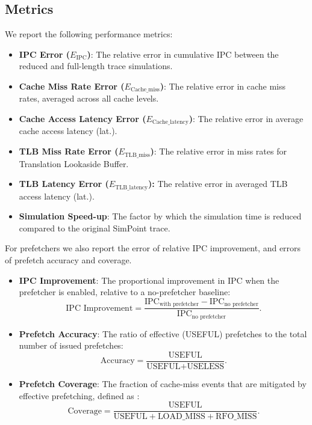 \documentclass[conference]{IEEEtran}
\begin{document}
\subsection{Metrics}
We report the following performance metrics:
\begin{itemize}[nosep, leftmargin=*]
    \item \textbf{IPC Error ($E_{\text{IPC}}$)}: The relative error in cumulative IPC between the reduced and full-length trace simulations.
    \item \textbf{Cache Miss Rate Error ($E_{\text{Cache\_miss}}$)}: The relative error in cache miss rates, averaged across all cache levels.
    \item \textbf{Cache Access Latency Error ($E_{\text{Cache\_latency}}$)}: The relative error in average cache access {latency (lat.)}.
    \item \textbf{TLB Miss Rate Error ($E_{\text{TLB\_miss}}$)}: The relative error in miss rates for Translation Lookaside Buffer.
    \item \textbf{TLB Latency Error ($E_{\text{TLB\_latency}}$):} The relative error in averaged TLB access {latency (lat.)}.
    \item \textbf{Simulation Speed-up}: The factor by which the simulation time is reduced compared to the original SimPoint trace.
\end{itemize}
For prefetchers we also report the error of relative IPC improvement, and errors of prefetch accuracy and coverage.
\begin{itemize}[nosep, leftmargin=*]
    \item \textbf{IPC Improvement}: The proportional improvement in IPC when the prefetcher is enabled, relative to a no-prefetcher baseline:
    \[
    \text{IPC Improvement} = \frac{\text{IPC}_{\text{with prefetcher}} - \text{IPC}_{\text{no prefetcher}}}{\text{IPC}_{\text{no prefetcher}}}.
    \]
    \item \textbf{Prefetch Accuracy}: The ratio of effective (USEFUL) prefetches to the total number of issued prefetches:
    \[
    \text{Accuracy} = \frac{\text{USEFUL}}{\text{USEFUL} + \text{USELESS}}.
    \]
    \item \textbf{Prefetch Coverage}: The fraction of cache-miss events that are mitigated by effective prefetching, defined as :
    \[
    \text{Coverage} = \frac{\text{USEFUL}}{\text{USEFUL} + \text{LOAD\_MISS} + \text{RFO\_MISS}}.
    \]
\end{itemize}
\end{document}
